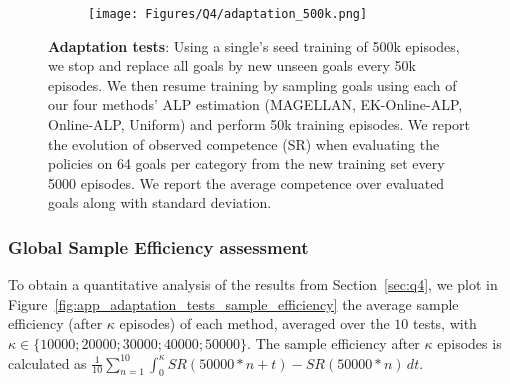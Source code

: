 \begin{figure}[h!]
\begin{subfigure}[t]{0.24\linewidth}
        \label{fig:app_sub_i}
    \end{subfigure}  
    \begin{subfigure}[t]{0.24\linewidth}
        \centering
        \texttt{[image: Figures/Q4/adaptation\_500k.png]}
        \caption{}
        \label{fig:app_sub_j}
    \end{subfigure}
    \caption{\textbf{Adaptation tests}: Using a single's seed training of 500k episodes, we stop and replace all goals by new unseen goals every 50k episodes. We then resume training by sampling goals using each of our four methods' ALP estimation (MAGELLAN, EK-Online-ALP, Online-ALP, Uniform) and perform 50k training episodes. We report the evolution of observed competence (SR) when evaluating the policies on 64 goals per category from the new training set every 5000 episodes. We report the average competence over evaluated goals along with standard deviation.}
    \label{fig:adaptation_tests}
\end{figure}

\subsubsection{Global Sample Efficiency assessment}
\label{app:global_sample_efficiency_assessment}

To obtain a quantitative analysis of the results from Section~\ref{sec:q4}, we plot in Figure~\ref{fig:app_adaptation_tests_sample_efficiency} the average sample efficiency (after $\kappa$ episodes) of each method, averaged over the $10$ tests, with $\kappa \in \{10 000; 20000; 30000; 40000; 50000 \}$. The sample efficiency after $\kappa$ episodes is calculated as $\frac{1}{10}\sum_{n=1}^{10}\int_{0}^{\kappa} SR(50000*n  +t)-SR(50000*n) \,dt$.

